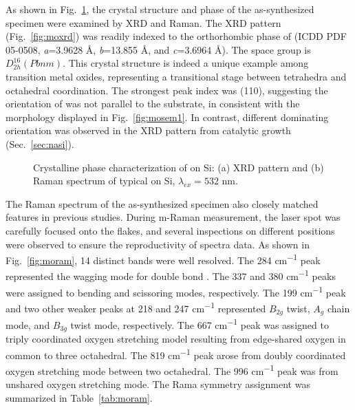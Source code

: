 As shown in Fig.~\ref{fig:mooxch}, the crystal structure and phase of the as-synthesized specimen were examined by XRD and Raman. The XRD pattern (Fig.~\ref{fig:moxrd}) was readily indexed to the orthorhombic phase of  (ICDD PDF 05-0508, \emph{a}=3.9628 \AA, \emph{b}=13.855 \AA, and \emph{c}=3.6964 \AA). The space group is $D_{2h}^{16}(Pbnm)$. This crystal structure is indeed a unique example among transition metal oxides, representing a transitional stage between tetrahedra and octahedral coordination.\cite{Itoh2001a} The strongest peak index was (110), suggesting the orientation of  was not parallel to the substrate, in consistent with the morphology displayed in Fig.~\ref{fig:mosem1}. In contrast, different dominating orientation was observed in the XRD pattern from catalytic growth (Sec.~\ref{sec:nasi}).
\begin{figure}[htb]
\centering
{}\hspace{0.04\textwidth}
\caption[Crystalline phase characterization of  on Si]{Crystalline phase characterization of  on Si: (a) XRD pattern and (b) Raman spectrum of typical  on Si, $\lambda_{ex} = 532$ nm.}
\label{fig:mooxch}
\end{figure}
The Raman spectrum of the as-synthesized specimen also closely matched  features in previous studies.\cite{Dixit1986,Silveira2012} During m-Raman measurement, the laser spot was carefully focused onto the  flakes, and several inspections on different positions were observed to ensure the reproductivity of spectra data. As shown in Fig.~\ref{fig:moram}, 14 distinct bands were well resolved. The 284 \si{cm^{-1}} peak represented the wagging mode for double bond . The 337 and 380  \si{cm^{-1}} peaks were assigned to  bending and scissoring modes, respectively. The 199 \si{cm^{-1}} peak and two other weaker peaks at 218 and 247 \si{cm^{-1}} represented  $B_{2g}$ twist, $A_g$ chain mode, and  $B_{3g}$ twist mode, respectively. The 667 \si{cm^{-1}} peak was assigned to triply coordinated oxygen stretching model resulting from edge-shared oxygen in common to three octahedral. The 819 \si{cm^{-1}} peak arose from doubly coordinated oxygen stretching mode between two octahedral. The 996 \si{cm^{-1}} peak was from unshared oxygen stretching mode.\cite{Siciliano2009} The Rama symmetry assignment was summarized in Table~\ref{tab:moram}.
